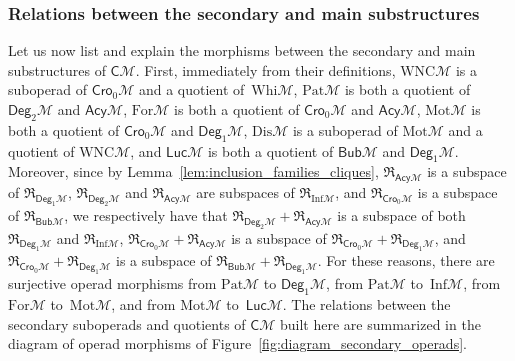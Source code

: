 \documentclass[10pt,reqno]{amsart}
\numberwithin{equation}{subsection}
\newcommand{\Mca}{\mathcal{M}}
\newcommand{\Cli}{\mathsf{C}}
\newcommand{\Bub}{\mathsf{Bub}}
\newcommand{\Deg}{\mathsf{Deg}}
\newcommand{\Cro}{\mathsf{Cro}}
\newcommand{\Acy}{\mathsf{Acy}}
\newcommand{\Whi}{\mathrm{Whi}}
\newcommand{\Inf}{\mathrm{Inf}}
\newcommand{\Paths}{\mathrm{Pat}}
\newcommand{\Forests}{\mathrm{For}}
\newcommand{\Motzkin}{\mathrm{Mot}}
\newcommand{\Diss}{\mathrm{Dis}}
\newcommand{\WNC}{\mathrm{WNC}}
\newcommand{\Luc}{\mathsf{Luc}}
\newcommand{\Rel}{\mathfrak{R}}
\begin{document}
\subsubsection{Relations between the secondary and main substructures}
Let us now list and explain the morphisms between the secondary and main
substructures of $\Cli\Mca$. First, immediately from their definitions,
$\WNC\Mca$ is a suboperad of $\Cro_0\Mca$ and a quotient of~$\Whi\Mca$,
$\Paths\Mca$ is both a quotient of $\Deg_2\Mca$ and $\Acy\Mca$,
$\Forests\Mca$ is both a quotient of $\Cro_0\Mca$ and $\Acy\Mca$,
$\Motzkin\Mca$ is both a quotient of $\Cro_0\Mca$ and $\Deg_1\Mca$,
$\Diss\Mca$ is a suboperad of $\Motzkin\Mca$ and a quotient of
$\WNC\Mca$, and $\Luc\Mca$ is both a quotient of $\Bub\Mca$ and
$\Deg_1\Mca$. Moreover, since by
Lemma~\ref{lem:inclusion_families_cliques}, $\Rel_{\Acy\Mca}$ is a
subspace of $\Rel_{\Deg_1\Mca}$, $\Rel_{\Deg_2\Mca}$ and
$\Rel_{\Acy\Mca}$ are subspaces of $\Rel_{\Inf\Mca}$, and
$\Rel_{\Cro_0\Mca}$ is a subspace of $\Rel_{\Bub\Mca}$, we respectively
have that $\Rel_{\Deg_2\Mca} + \Rel_{\Acy\Mca}$ is a subspace of both
$\Rel_{\Deg_1\Mca}$ and $\Rel_{\Inf\Mca}$,
$\Rel_{\Cro_0\Mca} + \Rel_{\Acy\Mca}$ is a subspace of
$\Rel_{\Cro_0\Mca} + \Rel_{\Deg_1\Mca}$, and
$\Rel_{\Cro_0\Mca} + \Rel_{\Deg_1\Mca}$ is a subspace of
$\Rel_{\Bub\Mca} + \Rel_{\Deg_1\Mca}$. For these reasons, there are
surjective operad morphisms from $\Paths\Mca$ to $\Deg_1\Mca$, from
$\Paths\Mca$ to~$\Inf\Mca$, from $\Forests\Mca$ to~$\Motzkin\Mca$, and
from $\Motzkin\Mca$ to~$\Luc\Mca$. The relations between the secondary
suboperads and quotients of $\Cli\Mca$ built here are summarized in the
diagram of operad morphisms of
Figure~\ref{fig:diagram_secondary_operads}.
\end{document}
